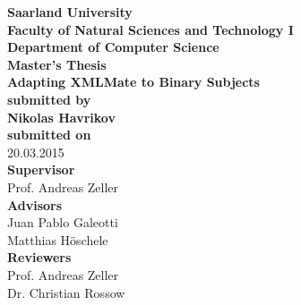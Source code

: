 \begin{titlepage}
\begin{center}
{\LARGE \bfseries Saarland University \\
Faculty of Natural Sciences and Technology I \\[0.1cm]
Department of Computer Science}\\[2.5cm]

{\Large \bfseries Master's Thesis}\\[1cm]
{\LARGE \bfseries Adapting XMLMate to Binary Subjects}\\[2cm]
{\small \bfseries submitted by}\\[0.5cm]
{\large \bfseries Nikolas Havrikov}\\[1cm]
{\small \bfseries submitted on}\\
20.03.2015\\[2.5cm]
{\bfseries Supervisor}\\[0.2cm]
Prof. Andreas Zeller\\[1cm]
{\bfseries Advisors}\\[0.2cm]
Juan Pablo Galeotti\\[0.1cm]
Matthias Höschele\\[1cm]
{\bfseries Reviewers}\\[0.2cm]
Prof. Andreas Zeller\\[0.1cm]
Dr. Christian Rossow
\end{center}
\end{titlepage}